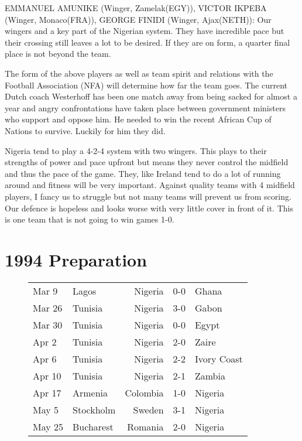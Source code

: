 EMMANUEL AMUNIKE (Winger, Zamelak(EGY)), 
VICTOR IKPEBA (Winger, Monaco(FRA)), 
GEORGE FINIDI (Winger, Ajax(NETH)):
Our wingers and a key part of the Nigerian system. They have incredible pace 
but their crossing still leaves a lot to be desired. If they are on form, a 
quarter final place is not beyond the team.

The form of the above players as well as team spirit and relations with the 
Football Association (NFA) will determine how far the team goes. The current 
Dutch coach Westerhoff has been one match away from being sacked for almost a 
year and angry confrontations have taken place between government ministers who 
support and oppose him. He needed to win the recent African Cup of Nations to 
survive. Luckily for him they did.

Nigeria tend to play a 4-2-4 system with two wingers. This plays to their 
strengths of power and pace upfront but means they never control the midfield 
and thus the pace of the game. They, like Ireland tend to do a lot of running 
around and fitness will be very important. Against quality teams with 4 
midfield players, I fancy us to struggle but not many teams will prevent us 
from scoring. Our defence is hopeless and looks worse with very little cover 
in front of it. This is one team that is not going to win games 1-0.
\section{1994 Preparation}
\begin{figure}[H]
\begin{tabular}{l l r c l}
Mar 9 & Lagos & Nigeria & 0-0 & Ghana \\
Mar 26 & Tunisia & Nigeria & 3-0 & Gabon \\
Mar 30 & Tunisia & Nigeria & 0-0 & Egypt \\
Apr 2 & Tunisia & Nigeria & 2-0 & Zaire \\
Apr 6 & Tunisia & Nigeria & 2-2 & Ivory Coast \\
Apr 10 & Tunisia & Nigeria & 2-1 & Zambia \\
Apr 17 & Armenia & Colombia & 1-0 & Nigeria \\
May 5 & Stockholm & Sweden & 3-1 & Nigeria \\
May 25 & Bucharest & Romania & 2-0 & Nigeria \\
\end{tabular}
\end{figure}
